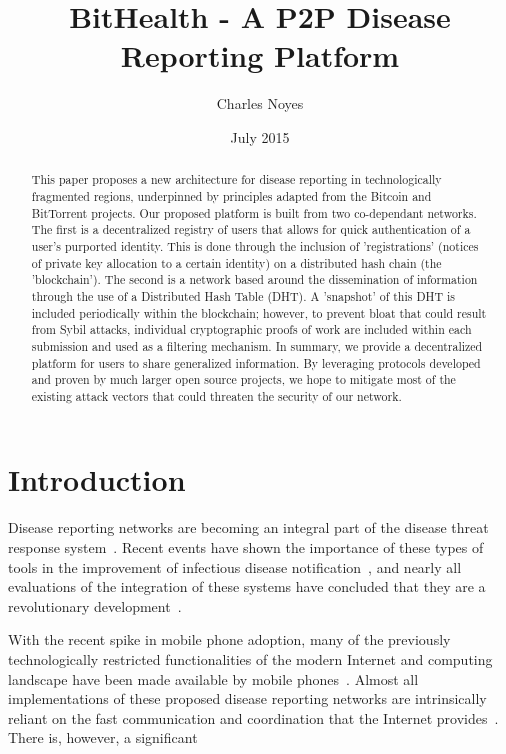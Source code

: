 \documentclass{article}
\title{BitHealth - A P2P Disease Reporting Platform}
\author{Charles Noyes}
\date{July 2015}
\begin{document}
\maketitle

\begin{abstract}
This paper proposes a new architecture for disease reporting in technologically fragmented regions, underpinned by principles adapted from the Bitcoin and BitTorrent projects. Our proposed platform is built from two co-dependant networks. The first is a decentralized registry of users that allows for quick authentication of a user's purported identity. This is done through the inclusion of 'registrations' (notices of private key allocation to a certain identity) on a distributed hash chain (the 'blockchain'). The second is a network based around the dissemination of information through the use of a Distributed Hash Table (DHT). A 'snapshot' of this DHT is included periodically within the blockchain; however, to prevent bloat that could result from Sybil attacks, individual cryptographic proofs of work are included within each submission and used as a filtering mechanism. In summary, we provide a decentralized platform for users to share generalized information. By leveraging protocols developed and proven by much larger open source projects, we hope to mitigate most of the existing attack vectors that could threaten the security of our network.
\end{abstract}


\maketitle

\section{Introduction}
\par Disease reporting networks are becoming an integral part of the disease threat response system~\cite{Heymann:1998ty}. Recent events have shown the importance of these types of tools in the improvement of infectious disease notification~\cite{Ward:2005vk}, and nearly all evaluations of the integration of these systems have concluded that they are a revolutionary development~\cite{Jajosky:2004ty,Lazarus:2009wz,Overhage:2001vq}. 

\par With the recent spike in mobile phone adoption, many of the previously technologically restricted functionalities of the modern Internet and computing landscape have been made available by mobile phones~\cite{Buford:2009jn}. Almost all implementations of these proposed disease reporting networks are intrinsically reliant on the fast communication and coordination that the Internet provides~\cite{Rolfhamre:2005wy,Krause:2007wn}. There is, however, a significant 
\end{document}
